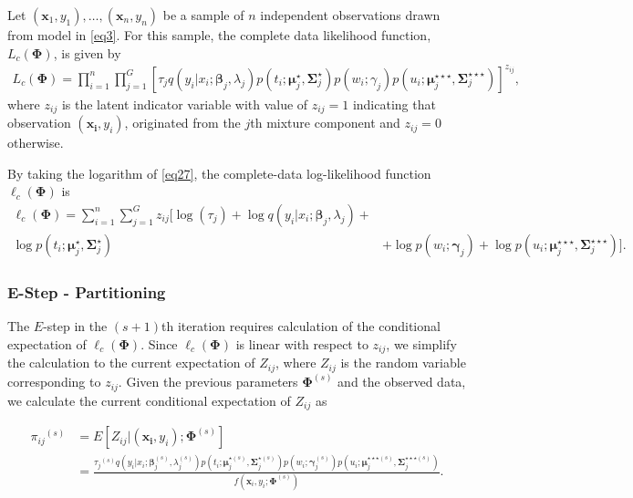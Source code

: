\documentclass[11pt,letterpaper]{article}
\numberwithin{equation}{section}
\numberwithin{equation}{section}
\numberwithin{equation}{section}
\begin{document}
Let $(\bm x_1, y_1),\ldots, (\bm x_n, y_n)$ be a sample of $n$ independent observations drawn from model in \eqref{eq3}.
For this sample, the complete data likelihood function, $L_c(\bm\Phi)$, is given by
\begin{align}
L_c(\bm\Phi)=\prod_{i=1}^{n}\prod_{j=1}^{G}\left[{\tau_j}q(y_i|x_i; \bm \beta_j, \lambda_{j})p(t_i; \bm\mu_j^{\star}, \bm\Sigma_j^{\star}) p(w_i; \gamma_j)p(u_i; \bm{\mu}_j^{\star\star\star},\bm{\Sigma}_j^{\star\star\star}) \right]^{z_{ij}},
\label{eq27}
\end{align}
where $z_{ij}$ is the latent indicator variable with value of $z_{ij}=1$ indicating that observation $(\bm{x_i}, y_i)$, originated from the $j$th mixture component and $z_{ij}=0$ otherwise.

By taking the logarithm of \eqref{eq27}, the complete-data log-likelihood function $\ell_c(\bm\Phi)$ is 
\begin{equation}\begin{split}
\ell_c(\bm\Phi)= \sum_{i=1}^{n}\sum_{j=1}^{G}{z_{ij}}\big[\log(\tau_{j}) + \log{q}(y_i|x_i; \bm{\beta}_j,\lambda_j)+& \\ \log p(t_i; \bm{\mu}_j^{\star}, \bm{\Sigma}_j^{\star}) & + \log p(w_i; \bm{\gamma}_j) +\log {p}(u_i; \bm{\mu}_j^{\star\star\star},\bm{\Sigma}_j^{\star\star\star}) \big].
\label{CompleteLiklihood}
\end{split}\end{equation}

\subsubsection{E-Step - Partitioning}
The $E$-step in the $(s+1)$th iteration requires calculation of the conditional expectation of $\ell_c(\bm\Phi)$. Since  $\ell_c(\bm\Phi)$ is linear with respect to  $z_{ij}$, we simplify the calculation to the current expectation of $Z_{ij}$, where $Z_{ij}$ is the random variable corresponding to $z_{ij}$. Given the previous parameters $\bm\Phi^{(s)}$ and the observed data,  we calculate the current conditional expectation of $Z_{ij}$ as

\begin{equation*}\begin{split}
    {\pi_{ij}}^{(s)} &= {E}[Z_{ij} |(\bm{x_i}, y_i); \bm{\Phi}^{(s)}]\\
     &= \frac{{\tau_j}^{(s)}q(y_i|x_i; \bm \beta_j^{(s)}, \lambda^{(s)}_{j})p(t_i; \bm\mu_j^{{\star}(s)}, \bm\Sigma_j^{{\star}(s)}) p(w_i; \bm \gamma_j^{(s)})p(u_i; \bm{\mu}_j^{\star\star\star (s)},\bm{\Sigma}_j^{\star\star\star (s)})}{f(\bm{x}_i, y_i; \bm{\Phi}^{(s)})
\label{eq29}                       }.
\end{split}\end{equation*}
\end{document}
